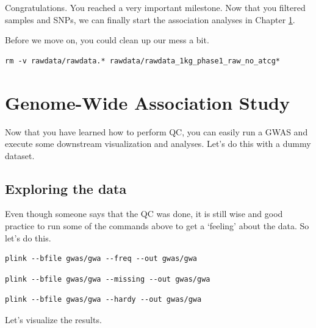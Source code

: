 \documentclass[
]{book}
\begin{document}
Congratulations. You reached a very important milestone. Now that you filtered samples and SNPs, we can finally start the association analyses in Chapter \ref{gwas-testing}.

Before we move on, you could clean up our mess a bit.

\begin{verbatim}
rm -v rawdata/rawdata.* rawdata/rawdata_1kg_phase1_raw_no_atcg*
\end{verbatim}

\hypertarget{gwas-testing}{%
\chapter{Genome-Wide Association Study}\label{gwas-testing}}

Now that you have learned how to perform QC, you can easily run a GWAS and execute some downstream visualization and analyses. Let's do this with a dummy dataset.

\hypertarget{exploring-the-data}{%
\section{Exploring the data}\label{exploring-the-data}}

Even though someone says that the QC was done, it is still wise and good practice to run some of the commands above to get a `feeling' about the data. So let's do this.

\begin{verbatim}
plink --bfile gwas/gwa --freq --out gwas/gwa
\end{verbatim}

\begin{verbatim}
plink --bfile gwas/gwa --missing --out gwas/gwa
\end{verbatim}

\begin{verbatim}
plink --bfile gwas/gwa --hardy --out gwas/gwa
\end{verbatim}

Let's visualize the results.
\end{document}
